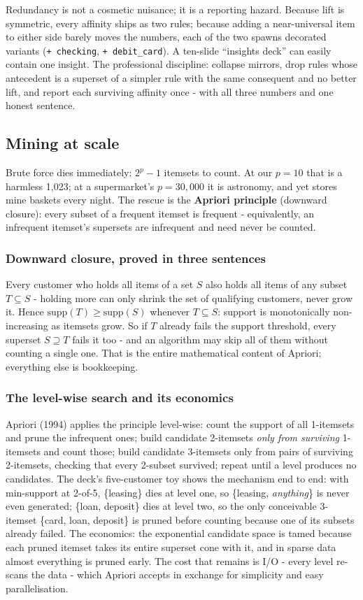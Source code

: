 \documentclass[11pt,a4paper]{article}
\begin{document}
Redundancy is not a cosmetic nuisance; it is a reporting hazard. Because
lift is symmetric, every affinity ships as two rules; because adding a
near-universal item to either side barely moves the numbers, each of the
two spawns decorated variants (\texttt{+ checking},
\texttt{+ debit\_card}). A ten-slide ``insights deck'' can easily contain
one insight. The professional discipline: collapse mirrors, drop rules
whose antecedent is a superset of a simpler rule with the same consequent
and no better lift, and report each surviving affinity once - with all
three numbers and one honest sentence.

\subsection{Mining at scale}
Brute force dies immediately: $2^p - 1$ itemsets to count. At our
$p = 10$ that is a harmless 1{,}023; at a supermarket's
$p = 30{,}000$ it is astronomy, and yet stores mine baskets every night.
The rescue is the \textbf{Apriori principle} (downward closure): every
subset of a frequent itemset is frequent - equivalently, an infrequent
itemset's supersets are infrequent and need never be counted.

\subsubsection{Downward closure, proved in three sentences}
Every customer who holds all items of a set $S$ also holds all items of
any subset $T \subseteq S$ - holding more can only shrink the set of
qualifying customers, never grow it. Hence
$\text{supp}(T) \geq \text{supp}(S)$ whenever $T \subseteq S$: support
is monotonically non-increasing as itemsets grow. So if $T$ already
fails the support threshold, every superset $S \supseteq T$ fails it
too - and an algorithm may skip all of them without counting a single
one. That is the entire mathematical content of Apriori; everything else
is bookkeeping.

\subsubsection{The level-wise search and its economics}
Apriori (1994) applies the principle level-wise: count the support of all
1-itemsets and prune the infrequent ones; build candidate 2-itemsets
\emph{only from surviving} 1-itemsets and count those; build candidate
3-itemsets only from pairs of surviving 2-itemsets, checking that every
2-subset survived; repeat until a level produces no candidates. The deck's
five-customer toy shows the mechanism end to end: with min-support at
2-of-5, \{leasing\} dies at level one, so \{leasing, \emph{anything}\} is
never even generated; \{loan, deposit\} dies at level two, so the only
conceivable 3-itemset \{card, loan, deposit\} is pruned before counting
because one of its subsets already failed. The economics: the exponential
candidate space is tamed because each pruned itemset takes its entire
superset cone with it, and in sparse data almost everything is pruned
early. The cost that remains is I/O - every level re-scans the data -
which Apriori accepts in exchange for simplicity and easy
parallelisation.
\end{document}
